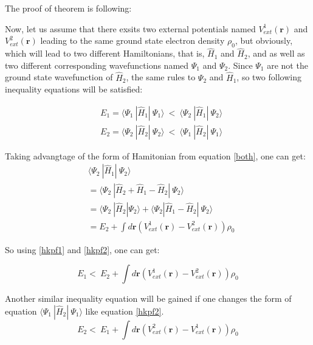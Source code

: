 \documentclass[a4paper, 12pt, titlepage,oneside,drop]{kthesis}
\begin{document}
\noindent The proof of theorem is following:

\noindent Now, let us assume that there exsits two external potentials named $V^{1}_\textit{ext}(\textbf{r})$ and $V^{2}_\textit{ext}(\textbf{r})$ leading to the same ground state 
electron density $\rho_0$, but obviously, which will lead to two different Hamiltonians, that is, $\hat{H}_{1}$ and $\hat{H}_{2}$, and as well as two different corresponding
wavefunctions named $\Psi_1$ and $\Psi_2$. Since $\Psi_1$ are not the ground state wavefunction of $\hat{H}_{2}$, the same rules to $\Psi_2$ and $\hat{H}_{1}$, so two following
inequality equations will be satisfied:

\begin{equation}\label{hkpf1}\begin{split}
&  E_1 = \langle \Psi_1\ |\hat{H}_{1}|\ \Psi_1 \rangle  \ < \  \langle \Psi_2\ |\hat{H}_{1}|\ \Psi_2 \rangle\\
&  E_2 = \langle \Psi_2\ |\hat{H}_{2}|\ \Psi_2 \rangle  \ < \  \langle \Psi_1\ |\hat{H}_{2}|\ \Psi_1 \rangle
\end{split}\end{equation}

\noindent Taking advangtage of the form of Hamitonian from equation \ref{both}, one can get:
\begin{equation}\label{hkpf2}\begin{split}
&    \langle \Psi_2\ |\hat{H}_{1}|\ \Psi_2 \rangle \\
&  = \langle \Psi_2\ |\hat{H}_{2} + \hat{H}_{1} - \hat{H}_{2}|\ \Psi_2 \rangle \\
&  = \langle \Psi_2\ |\hat{H}_{2} |\Psi_2 \rangle + \langle \Psi_2 | \hat{H}_{1} - \hat{H}_{2}|\ \Psi_2 \rangle \\
&  = E_2 + \int d \textbf{r} ( V^{1}_\textit{ext}(\textbf{r}) - V^{2}_\textit{ext}(\textbf{r}) )  \rho_0
\end{split}\end{equation}

\noindent So using \ref{hkpf1} and \ref{hkpf2}, one can get:

\begin{equation}\label{hkpf3}
 E_1  < \  E_2 + \int d \textbf{r} ( V^{1}_\textit{ext}(\textbf{r}) - V^{2}_\textit{ext}(\textbf{r}) )  \rho_0
\end{equation}

\noindent Another similar inequality equation will be gained if one changes the form of equation $\langle \Psi_1\ |\hat{H}_{2}|\ \Psi_1 \rangle$ like equation \ref{hkpf2}.
\begin{equation}\label{hkpf4}
  E_2  < \  E_1 + \int d \textbf{r} ( V^{2}_\textit{ext}(\textbf{r}) - V^{1}_\textit{ext}(\textbf{r}) )  \rho_0
\end{equation}
\end{document}
